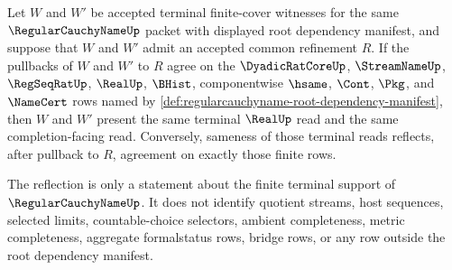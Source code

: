 \begin{theorem}
\label{thm:regularcauchyname-terminal-finite-cover-refinement-reflection}
Let $W$ and $W'$ be accepted terminal finite-cover witnesses for the same $\RegularCauchyNameUp$ packet with displayed root dependency manifest, and suppose that $W$ and $W'$ admit an accepted common refinement $R$. If the pullbacks of $W$ and $W'$ to $R$ agree on the $\DyadicRatCoreUp$, $\StreamNameUp$, $\RegSeqRatUp$, $\RealUp$, $\BHist$, componentwise $\hsame$, $\Cont$, $\Pkg$, and $\NameCert$ rows named by \autoref{def:regularcauchyname-root-dependency-manifest}, then $W$ and $W'$ present the same terminal $\RealUp$ read and the same completion-facing read. Conversely, sameness of those terminal reads reflects, after pullback to $R$, agreement on exactly those finite rows.

The reflection is only a statement about the finite terminal support of $\RegularCauchyNameUp$. It does not identify quotient streams, host sequences, selected limits, countable-choice selectors, ambient completeness, metric completeness, aggregate formalstatus rows, bridge rows, or any row outside the root dependency manifest.
\end{theorem}
